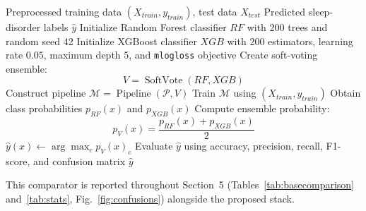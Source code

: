 \documentclass{elektr}
\begin{document}
\begin{algorithm}[H]
\caption{Soft-voting ensemble using Random Forest and XGBoost}
\label{alg:voting}
\begin{algorithmic}[1]
\Require Preprocessed training data $(X_{train}, y_{train})$, test data $X_{test}$
\Ensure Predicted sleep-disorder labels $\hat{y}$
\State Initialize Random Forest classifier $RF$ with 200 trees and random seed 42
\State Initialize XGBoost classifier $XGB$ with 200 estimators, learning rate $0.05$, maximum depth $5$, and \texttt{mlogloss} objective
\State Create soft-voting ensemble:
\[
V = \operatorname{SoftVote}(RF, XGB)
\]
\State Construct pipeline $\mathcal{M} = \operatorname{Pipeline}(\mathcal{P}, V)$
\State Train $\mathcal{M}$ using $(X_{train}, y_{train})$
    \State Obtain class probabilities $p_{RF}(x)$ and $p_{XGB}(x)$
    \State Compute ensemble probability:
    \[
    p_V(x) = \frac{p_{RF}(x) + p_{XGB}(x)}{2}
    \]
    \State $\hat{y}(x) \gets \arg\max_c p_V(x)_c$
\EndFor
\State Evaluate $\hat{y}$ using accuracy, precision, recall, F1-score, and confusion matrix
\State \Return $\hat{y}$
\end{algorithmic}
\end{algorithm}

This comparator is reported throughout Section~5 (Tables~\ref{tab:basecomparison} and~\ref{tab:stats}, Fig.~\ref{fig:confusions}) alongside the proposed stack.

\FloatBarrier
\end{document}
